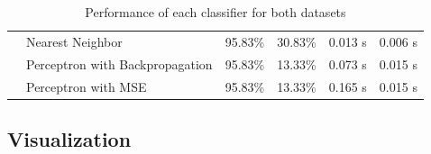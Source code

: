 \begin{table}[!htbp]
\begin{tabular}{|l|l|l|l|l|l|}
    \cline{2-6}
            & Nearest Neighbor                & 95.83\%              & 30.83\%              & 0.013 s              & 0.006 s    \\ 
    \cline{2-6}
            & Perceptron with Backpropagation & 95.83\%              & 13.33\%              & 0.073 s              & 0.015 s    \\ 
    \cline{2-6}
            & Perceptron with MSE             & 95.83\%              & 13.33\%              & 0.165 s              & 0.015 s    \\
    \hline
    \end{tabular}
    \caption{Performance of each classifier for both datasets}
    \label{tab:classifiers-performance}
\end{table}

\subsection{Visualization}

